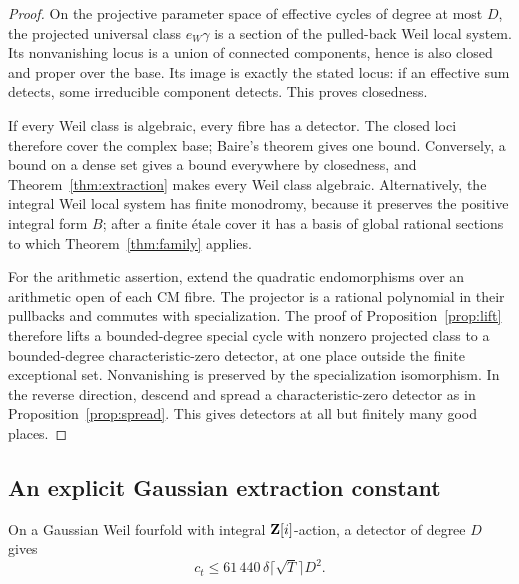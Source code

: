 \begin{proof}
On the projective parameter space of effective cycles of degree at most $D$, the projected universal class $e_W\gamma$ is a section of the pulled-back Weil local system. Its nonvanishing locus is a union of connected components, hence is also closed and proper over the base. Its image is exactly the stated locus: if an effective sum detects, some irreducible component detects. This proves closedness.

If every Weil class is algebraic, every fibre has a detector. The closed loci therefore cover the complex base; Baire's theorem gives one bound. Conversely, a bound on a dense set gives a bound everywhere by closedness, and Theorem~\ref{thm:extraction} makes every Weil class algebraic. Alternatively, the integral Weil local system has finite monodromy, because it preserves the positive integral form $B$; after a finite \'etale cover it has a basis of global rational sections to which Theorem~\ref{thm:family} applies.

For the arithmetic assertion, extend the quadratic endomorphisms over an arithmetic open of each CM fibre. The projector is a rational polynomial in their pullbacks and commutes with specialization. The proof of Proposition~\ref{prop:lift} therefore lifts a bounded-degree special cycle with nonzero projected class to a bounded-degree characteristic-zero detector, at one place outside the finite exceptional set. Nonvanishing is preserved by the specialization isomorphism. In the reverse direction, descend and spread a characteristic-zero detector as in Proposition~\ref{prop:spread}. This gives detectors at all but finitely many good places.
\end{proof}

\subsection{An explicit Gaussian extraction constant}

\begin{proposition}\label{prop:gaussian-extraction}
On a Gaussian Weil fourfold with integral $\mathbf Z[i]$-action, a detector of degree $D$ gives
\[
 c_t\leq61\,440\,\delta\lceil\sqrt T\rceil D^2.
\]
\end{proposition}

